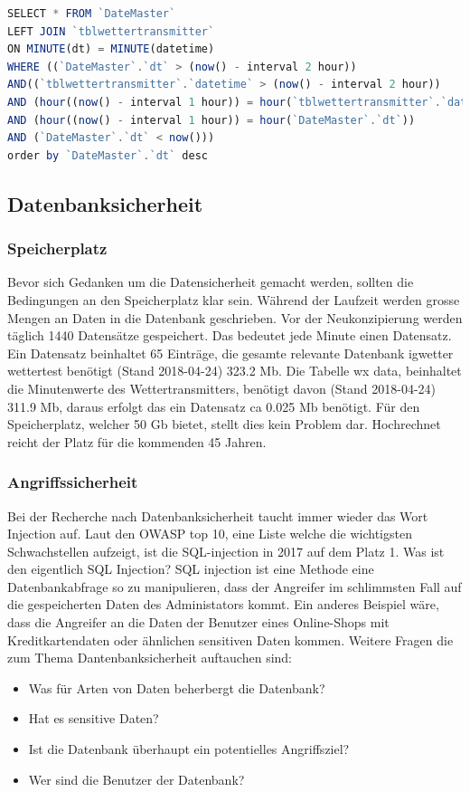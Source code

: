 \begin{lstlisting}[label=lst:LeftJoinQuery,caption=Json Struktur, language=JavaScript, style=htmlcssjs, mathescape]
SELECT * FROM `DateMaster`
LEFT JOIN `tblwettertransmitter`
ON MINUTE(dt) = MINUTE(datetime)
WHERE ((`DateMaster`.`dt` > (now() - interval 2 hour))
AND((`tblwettertransmitter`.`datetime` > (now() - interval 2 hour))
AND (hour((now() - interval 1 hour)) = hour(`tblwettertransmitter`.`datetime`)))
AND (hour((now() - interval 1 hour)) = hour(`DateMaster`.`dt`))
AND (`DateMaster`.`dt` < now()))
order by `DateMaster`.`dt` desc
\end{lstlisting} 

\subsection{Datenbanksicherheit}
\subsubsection{Speicherplatz}
Bevor sich Gedanken um die Datensicherheit gemacht werden, sollten die Bedingungen an den Speicherplatz klar sein. Während der Laufzeit werden grosse Mengen an Daten in die Datenbank geschrieben. Vor der Neukonzipierung werden täglich 1440 Datensätze gespeichert. Das bedeutet jede Minute einen Datensatz. Ein Datensatz beinhaltet 65 Einträge, die gesamte relevante Datenbank igwetter wettertest benötigt (Stand 2018-04-24) 323.2  Mb. Die Tabelle wx data, beinhaltet die Minutenwerte des Wettertransmitters, benötigt davon (Stand 2018-04-24) 311.9 Mb, daraus erfolgt das ein Datensatz ca 0.025 Mb benötigt. Für den Speicherplatz, welcher 50 Gb bietet, stellt dies kein Problem dar. Hochrechnet reicht der Platz für die kommenden 45 Jahren.

\subsubsection{Angriffssicherheit}
Bei der Recherche nach Datenbanksicherheit taucht immer wieder das Wort Injection auf. Laut den OWASP top 10, eine Liste welche die wichtigsten Schwachstellen aufzeigt, ist die SQL-injection in 2017 auf dem Platz 1. Was ist den eigentlich SQL Injection? SQL injection ist eine Methode eine Datenbankabfrage so zu manipulieren, dass der Angreifer im schlimmsten Fall auf die gespeicherten Daten des Administators kommt. Ein anderes Beispiel wäre, dass die Angreifer an die Daten der Benutzer eines Online-Shops mit Kreditkartendaten oder ähnlichen sensitiven Daten kommen.
Weitere Fragen die zum Thema Dantenbanksicherheit auftauchen sind:
\begin{itemize}
\item Was für Arten von Daten beherbergt die Datenbank?
\item Hat es sensitive Daten?
\item Ist die Datenbank überhaupt ein potentielles Angriffsziel?
\item Wer sind die Benutzer der Datenbank?
\end{itemize}

